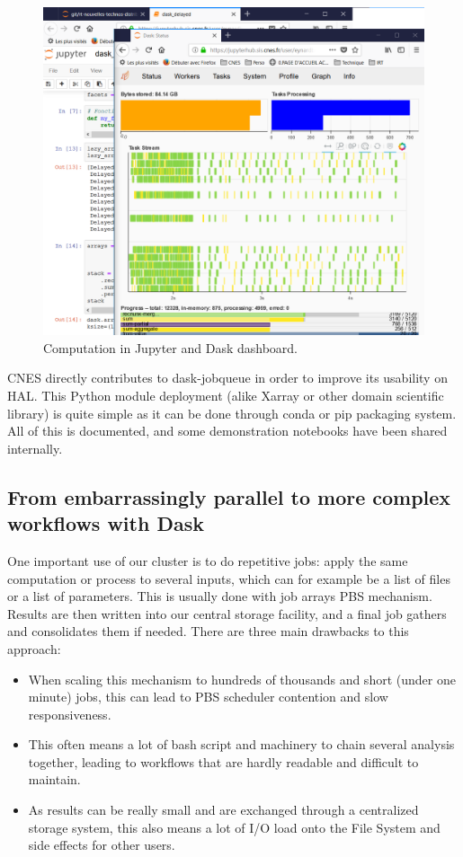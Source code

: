 \documentclass{article}
\begin{document}
\begin{figure}
  \centering
  \includegraphics[width=\columnwidth]{dask_jobqueue.png}
  \caption{\label{dask_jobqueue} Computation in Jupyter and Dask dashboard.}
\end{figure}

CNES directly contributes to dask-jobqueue in order to improve its usability on HAL. This Python module deployment (alike Xarray or other domain scientific library) is quite simple as it can be done through conda or pip packaging system. All of this is documented, and some demonstration notebooks have been shared internally.

\subsection{From embarrassingly parallel to more complex workflows with Dask}
\label{ssec:usecase1}

One important use of our cluster is to do repetitive jobs: apply the same computation or process to several inputs, which can for example be a list of files or a list of parameters. This is usually done with job arrays PBS mechanism. Results are then written into our central storage facility, and a final job gathers and consolidates them if needed. There are three main drawbacks to this approach:
\begin{itemize}
\item When scaling this mechanism to hundreds of thousands and short (under one minute) jobs, this can lead to PBS scheduler contention and slow responsiveness.
\item This often means a lot of bash script and machinery to chain several analysis together, leading to workflows that are hardly readable and difficult to maintain.
\item As results can be really small and are exchanged through a centralized storage system, this also means a lot of I/O load onto the File System and side effects for other users.
\end{itemize}
\end{document}
